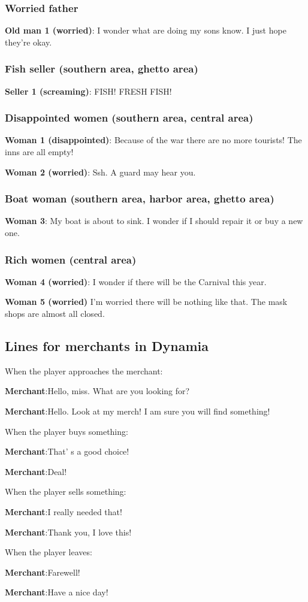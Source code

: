 \subsubsection*{Worried father}
\textbf{Old man 1 (worried)}: I wonder what are doing my sons know. I just hope they're okay.

\subsubsection*{Fish seller (southern area, ghetto area)}
\textbf{Seller 1 (screaming)}: FISH! FRESH FISH!

\subsubsection*{Disappointed women (southern area, central area)}
\textbf{Woman 1 (disappointed)}: Because of the war there are no more tourists! The inns are all empty!

\textbf{Woman 2 (worried)}: Ssh. A guard may hear you.

\subsubsection*{Boat woman (southern area, harbor area, ghetto area)}
\textbf{Woman 3}: My boat is about to sink. I wonder if I should repair it or buy a new one.

\subsubsection*{Rich women (central area)}
\textbf{Woman 4 (worried)}: I wonder if there will be the Carnival this year.

\textbf{Woman 5 (worried)} I'm worried there will be nothing like that. The mask shops are almost all closed.

\subsection{Lines for merchants in Dynamia}
When the player approaches the merchant:

\textbf{Merchant}:Hello, miss. What are you looking for?

\textbf{Merchant}:Hello. Look at my merch! I am sure you will find something!



When the player buys something:

\textbf{Merchant}:That' s a good choice!

\textbf{Merchant}:Deal!


When the player sells something:

\textbf{Merchant}:I really needed that!

\textbf{Merchant}:Thank you, I love this!


When the player leaves:

\textbf{Merchant}:Farewell!

\textbf{Merchant}:Have a nice day!
